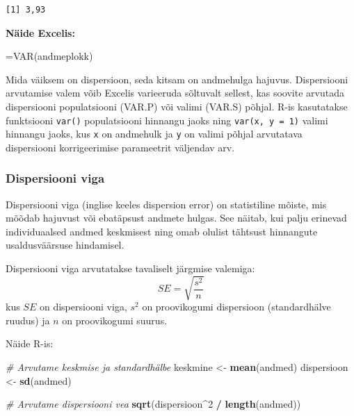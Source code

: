 \documentclass[
]{book}
\newenvironment{Shaded}{\begin{snugshade}}{\end{snugshade}}
\newcommand{\CommentTok}[1]{\textcolor[rgb]{0.56,0.35,0.01}{\textit{#1}}}
\newcommand{\DecValTok}[1]{\textcolor[rgb]{0.00,0.00,0.81}{#1}}
\newcommand{\FunctionTok}[1]{\textcolor[rgb]{0.13,0.29,0.53}{\textbf{#1}}}
\newcommand{\NormalTok}[1]{#1}
\newcommand{\OtherTok}[1]{\textcolor[rgb]{0.56,0.35,0.01}{#1}}
\newcommand{\SpecialCharTok}[1]{\textcolor[rgb]{0.81,0.36,0.00}{\textbf{#1}}}
\renewenvironment{Shaded} {\begin{snugshade}\footnotesize} {\end{snugshade}}
\begin{document}
\begin{verbatim}
[1] 3,93
\end{verbatim}

\textbf{Näide Excelis:}

\begin{Shaded}
\begin{Highlighting}[]
\NormalTok{\textasciigrave{}=VAR(andmeplokk)\textasciigrave{}}
\end{Highlighting}
\end{Shaded}

Mida väiksem on dispersioon, seda kitsam on andmehulga hajuvus. Dispersiooni arvutamise valem võib Excelis varieeruda sõltuvalt sellest, kas soovite arvutada dispersiooni populatsiooni (VAR.P) või valimi (VAR.S) põhjal. R-is kasutatakse funktsiooni \texttt{var()} populatsiooni hinnangu jaoks ning \texttt{var(x,\ y\ =\ 1)} valimi hinnangu jaoks, kus \texttt{x} on andmehulk ja \texttt{y} on valimi põhjal arvutatava dispersiooni korrigeerimise parameetrit väljendav arv.

\subsubsection{Dispersiooni viga}\label{dispersiooni-viga}

Dispersiooni viga (inglise keeles dispersion error) on statistiline mõiste, mis mõõdab hajuvust või ebatäpsust andmete hulgas. See näitab, kui palju erinevad individuaalsed andmed keskmisest ning omab olulist tähtsust hinnangute usaldusväärsuse hindamisel.

Dispersiooni viga arvutatakse tavaliselt järgmise valemiga:
\[ SE = \sqrt{\frac{s^2}{n}} \]
kus \(SE\) on dispersiooni viga, \(s^2\) on proovikogumi dispersioon (standardhälve ruudus) ja \(n\) on proovikogumi suurus.

Näide R-is:

\begin{Shaded}
\begin{Highlighting}[]
\CommentTok{\# Arvutame keskmise ja standardhälbe}
\NormalTok{keskmine }\OtherTok{\textless{}{-}} \FunctionTok{mean}\NormalTok{(andmed)}
\NormalTok{dispersioon }\OtherTok{\textless{}{-}} \FunctionTok{sd}\NormalTok{(andmed)}

\CommentTok{\# Arvutame dispersiooni vea}
\FunctionTok{sqrt}\NormalTok{(dispersioon}\SpecialCharTok{\^{}}\DecValTok{2} \SpecialCharTok{/} \FunctionTok{length}\NormalTok{(andmed))}
\end{Highlighting}
\end{Shaded}
\end{document}
